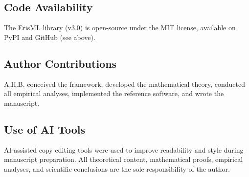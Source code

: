 \documentclass[12pt]{article}
\begin{document}
\subsection*{Code Availability}
The ErisML library (v3.0) is open-source under the MIT license, available on PyPI and GitHub (see above).

\subsection*{Author Contributions}
A.H.B. conceived the framework, developed the mathematical theory, conducted all empirical analyses, implemented the reference software, and wrote the manuscript.

\subsection*{Use of AI Tools}
AI-assisted copy editing tools were used to improve readability and style during manuscript preparation. All theoretical content, mathematical proofs, empirical analyses, and scientific conclusions are the sole responsibility of the author.
\end{document}
